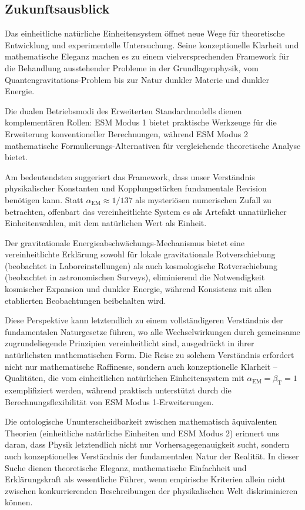 \documentclass[12pt,a4paper]{article}
\newcommand{\alphaEM}{\alpha_{\text{EM}}}
\newcommand{\betaT}{\beta_{\text{T}}}
\begin{document}
	\subsection{Zukunftsausblick}
	\label{subsec:future_outlook}
	
	Das einheitliche natürliche Einheitensystem öffnet neue Wege für theoretische Entwicklung und experimentelle Untersuchung. Seine konzeptionelle Klarheit und mathematische Eleganz machen es zu einem vielversprechenden Framework für die Behandlung ausstehender Probleme in der Grundlagenphysik, vom Quantengravitations-Problem bis zur Natur dunkler Materie und dunkler Energie.
	
	Die dualen Betriebsmodi des Erweiterten Standardmodells dienen komplementären Rollen: ESM Modus 1 bietet praktische Werkzeuge für die Erweiterung konventioneller Berechnungen, während ESM Modus 2 mathematische Formulierungs-Alternativen für vergleichende theoretische Analyse bietet.
	
	Am bedeutendsten suggeriert das Framework, dass unser Verständnis physikalischer Konstanten und Kopplungsstärken fundamentale Revision benötigen kann. Statt $\alphaEM \approx 1/137$ als mysteriösen numerischen Zufall zu betrachten, offenbart das vereinheitlichte System es als Artefakt unnatürlicher Einheitenwahlen, mit dem natürlichen Wert als Einheit.
	
	Der gravitationale Energieabschwächungs-Mechanismus bietet eine vereinheitlichte Erklärung sowohl für lokale gravitationale Rotverschiebung (beobachtet in Laboreinstellungen) als auch kosmologische Rotverschiebung (beobachtet in astronomischen Surveys), eliminierend die Notwendigkeit kosmischer Expansion und dunkler Energie, während Konsistenz mit allen etablierten Beobachtungen beibehalten wird.
	
	Diese Perspektive kann letztendlich zu einem vollständigeren Verständnis der fundamentalen Naturgesetze führen, wo alle Wechselwirkungen durch gemeinsame zugrundeliegende Prinzipien vereinheitlicht sind, ausgedrückt in ihrer natürlichsten mathematischen Form. Die Reise zu solchem Verständnis erfordert nicht nur mathematische Raffinesse, sondern auch konzeptionelle Klarheit – Qualitäten, die vom einheitlichen natürlichen Einheitensystem mit $\alphaEM = \betaT = 1$ exemplifiziert werden, während praktisch unterstützt durch die Berechnungsflexibilität von ESM Modus 1-Erweiterungen.
	
	Die ontologische Ununterscheidbarkeit zwischen mathematisch äquivalenten Theorien (einheitliche natürliche Einheiten und ESM Modus 2) erinnert uns daran, dass Physik letztendlich nicht nur Vorhersagegenauigkeit sucht, sondern auch konzeptionelles Verständnis der fundamentalen Natur der Realität. In dieser Suche dienen theoretische Eleganz, mathematische Einfachheit und Erklärungskraft als wesentliche Führer, wenn empirische Kriterien allein nicht zwischen konkurrierenden Beschreibungen der physikalischen Welt diskriminieren können.
	
\end{document}
